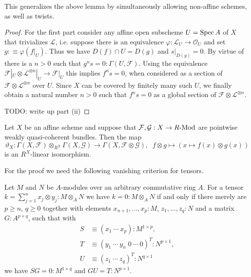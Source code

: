 This generalizes the above lemma by simultaneously allowing non-affine schemes, as well as twists.

\begin{proof}
  For the first part consider any affine open subscheme $U=\operatorname{Spec} A$ of $X$ that trivializes $\mathcal L$,
  i.e. suppose there is an equivalence  $\varphi:\mathcal L_U \to \mathcal O_U$ and set $g :\equiv \varphi(f|_U)$.
  Thus we have $D(f)\cap U = D(g)$ and $s|_{D(g)}=0$.
  By virtue of  there is a $n>0$ such that $g^ns=0: \Gamma (U,\mathcal F)$.
  Using the equivalence $\mathcal F|_U\otimes\mathcal L^{\otimes n}|_U \to \mathcal F|_U$ this implies $f^ns=0$,
  when considered as a section of $\mathcal F\otimes\mathcal L^{\otimes n}$ over $U$.
  Since $X$ can be covered by finitely many such $U$, we finally obtain a natural number $n>0$ such that $f^ns=0$ as a global section of $\mathcal F\otimes\mathcal L^{\otimes n}$.

  {\color{red} TODO: write up part (ii)}
\end{proof}


\begin{lemma}
  \label{tensor-gamma-commute-on-affines}
  Let $X$ be an affine scheme and suppose that $\mathcal F, \mathcal G : X \to R\text{-}\mathrm{Mod}$ are pointwise weakly quasi-coherent bundles.
  Then the map
  \[
    \vartheta_X : \Gamma(X,\mathcal F) \otimes_{R^X}\Gamma(X,\mathcal G) \to \Gamma(X,\mathcal F \otimes \mathcal G), \;\;
    f \otimes g \mapsto (x \mapsto f(x) \otimes g(x))
  \]
  is an $R^X$-linear isomorphism.
\end{lemma}

For the proof we need the following vanishing criterion for tensors.

\begin{remark}
  \label{null-tensor-criterion}
  Let $M$ and $N$ be $A$-modules over an arbitrary commutative ring $A$.
  For a tensor $k = \sum_{j=1}^n x_j \otimes y_j : M \otimes_A N$ we have $k = 0 : M \otimes_A N$ if and only if there merely are $p \geq n$, $q \geq 0$ together with elements $x_{n+1},\hdots,x_p : M$, $z_1,\hdots,z_q : N$ and a matrix $G : A^{p \times q}$, such that with
  \begin{align*}
    S &\equiv (x_1 \ \cdots \ x_p) : M^{1 \times p}, \\
    T &\equiv (y_1 \ \cdots \ y_n \; 0 \ \cdots \ 0)^T : N^{p \times 1}, \\
    U &\equiv (z_1 \ \cdots \ z_q)^T : N^{q \times 1}
  \end{align*}
  we have $SG = 0 : M^{1 \times q}$ and $GU = T : N^{p \times 1}$.
\end{remark}

